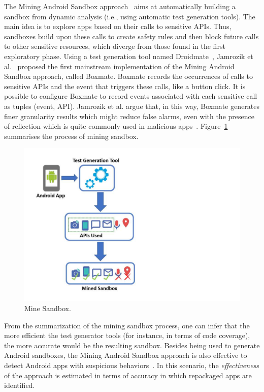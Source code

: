 The Mining Android Sandbox approach~\cite{DBLP:conf/icse/JamrozikSZ16} aims at automatically
building a sandbox from dynamic analysis (i.e., using automatic test generation tools).
The main idea is to explore apps based on their calls to sensitive APIs.
Thus, sandboxes build upon these calls to create safety rules and then block future
calls to other sensitive resources, which diverge from those found in the first exploratory
phase. Using a test generation tool named Droidmate~\cite{DBLP:conf/icse/JamrozikZ16},
Jamrozik et al.~\cite{DBLP:conf/icse/JamrozikSZ16} proposed the first mainstream
implementation of the Mining Android Sandbox approach, called Boxmate. 
Boxmate records the occurrences of calls to sensitive APIs and the event that triggers these calls,
like a button click. It is possible to configure Boxmate to record events associated with each sensitive call as
tuples (event, API). Jamrozik et al. argue that, in this way, Boxmate generates finer granularity results which
might reduce false alarms, even with the presence of reflection which is quite commonly used in
malicious apps~\cite{DBLP:conf/issta/0029BOK16}. Figure~\ref{fig:mineSandbox}  summarises the process of mining sandbox. 

\begin{figure}[ht]
\centering
\includegraphics[scale=0.35]{images/mineSandbox_.pdf}
\caption{Mine Sandbox.}
 \label{fig:mineSandbox}
\end{figure}

From the summarization of the mining sandbox process, one can infer that the more efficient the test generator
tools (for instance, in terms of code coverage), the more accurate would be the resulting
sandbox. Besides being used to generate Android sandboxes, the Mining Android Sandbox approach is also effective 
to detect Android apps with suspicious behaviors~\cite{DBLP:conf/wcre/BaoLL18}.  In this scenario, the \emph{effectiveness} of the approach
is estimated in terms of accuracy in which repackaged apps are identified.


